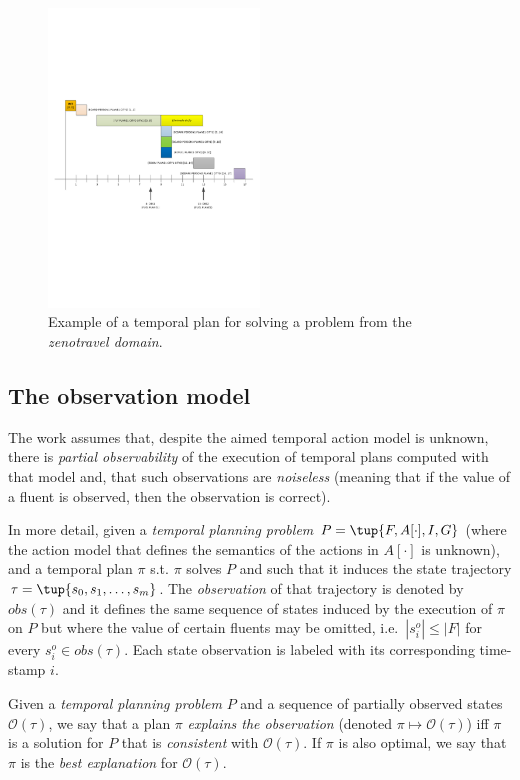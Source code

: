 \documentclass[runningheads]{llncs}
\begin{document}
\begin{figure}
        \includegraphics[width=0.5\textwidth]{plan}
	\caption{Example of a temporal plan for solving a problem from the {\em zenotravel domain}.}
	\label{fig:plan}
\end{figure}


\subsection{The observation model}
The work assumes that, despite the aimed temporal action model is unknown, there is {\em partial observability} of the execution of temporal plans computed with that model and, that such observations are {\em noiseless} (meaning that if the value of a fluent is observed, then the observation is correct).

In more detail, given a {\em temporal planning problem} $P=\tup{F,A[\cdot],I,G}$ (where the action model that defines the semantics of the actions in $A[\cdot]$ is unknown), and a temporal plan $\pi$ s.t. $\pi$ solves $P$ and such that it induces the state trajectory $\tau=\tup{s_0, s_1, \ldots, s_m}$. The {\em observation} of that trajectory is denoted by $obs(\tau)$ and it defines the same sequence of states induced by the execution of $\pi$ on $P$ but where the value of certain fluents may be omitted, i.e.~$|s^o_i|\leq |F|$ for every $s^o_i\in obs(\tau)$. Each state observation is labeled with its corresponding time-stamp $i$.

\begin{definition}
Given a {\em temporal planning problem} $P$ and a sequence of partially observed states $\mathcal{O}(\tau)$, we say that a plan $\pi$ {\em explains the observation} (denoted $\pi\mapsto\mathcal{O}(\tau)$) iff $\pi$ is a solution for $P$ that is {\em  consistent} with $\mathcal{O}(\tau)$. If $\pi$ is also optimal, we say that $\pi$ is the {\em best explanation} for $\mathcal{O}(\tau)$.
\end{definition}
\end{document}
